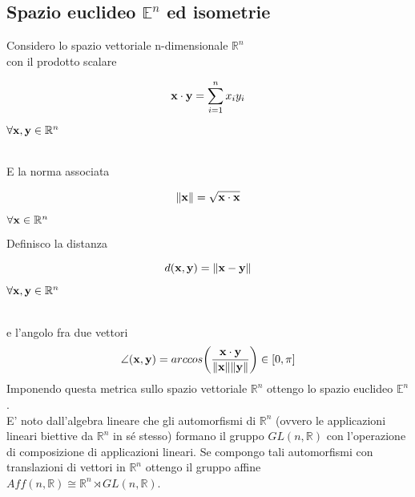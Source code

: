 \documentclass[10pt,a4paper]{book}
\begin{document}
\subsection{Spazio euclideo $\mathbb{E}^n$ ed isometrie}
Considero lo spazio vettoriale n-dimensionale $\mathbb{R}^{n}$  \\
con il prodotto scalare  \hfill
\begin{minipage}{0.3\textwidth}
\[
  \vb{x} \cdot \vb{y} =  \sum_{i=1}^{n} x_i y_i    
\]
\end{minipage} \hfill
\begin{minipage}{0.3\textwidth}
$ \forall \vb{x} , \vb{y} \in \mathbb{R}^{n}$
\end{minipage} \\
E la norma associata   \hfill             
\begin{minipage}{0.3\textwidth}
\[
  \norm{\vb{x}} =  \sqrt{\vb{x} \cdot \vb{x}}
\]
\end{minipage} \hfill
\begin{minipage}{0.3\textwidth}
$ \forall \vb{x} \in \mathbb{R}^{n}$
\end{minipage} \newline
Definisco la distanza \hfill 
\begin{minipage}{0.3\textwidth}
\[ d(\vb{x}, \vb{y} ) = \norm{\vb{x-y}}\] 
\end{minipage} \hfill
\begin{minipage}{0.3\textwidth}
$ \forall \vb{x} , \vb{y} \in \mathbb{R}^{n}$
\end{minipage} \\
e l'angolo fra due vettori \hfill
\[ \angle (\vb{x},\vb{y}) = arccos \bigg( \frac{\vb{x} \cdot \vb{y}}{\norm{\vb{x}} \norm{\vb{y}}} \bigg) \in [0, \pi] \]
Imponendo questa metrica sullo spazio vettoriale $\mathbb{R}^n$ ottengo lo spazio euclideo $\mathbb{E}^n$. \\
E' noto dall'algebra lineare che gli automorfismi di $\mathbb{R}^n$ (ovvero le applicazioni lineari biettive da $\mathbb{R}^n$ in sé stesso) formano il gruppo $ GL(n, \mathbb{R}) $ con l'operazione di composizione di applicazioni lineari. Se compongo tali automorfismi con translazioni di vettori in $\mathbb{R}^n$ ottengo il gruppo affine $Aff(n, \mathbb{R}) \cong \mathbb{R}^{n} \rtimes GL(n, \mathbb{R})$. 
\end{document}
